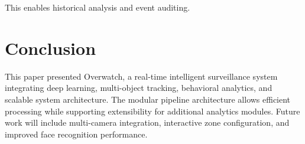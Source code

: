 \documentclass[conference]{IEEEtran}
\begin{document}
This enables historical analysis and event auditing.

\section{Conclusion}

This paper presented Overwatch, a real-time intelligent surveillance system integrating deep learning, multi-object tracking, behavioral analytics, and scalable system architecture. The modular pipeline architecture allows efficient processing while supporting extensibility for additional analytics modules. Future work will include multi-camera integration, interactive zone configuration, and improved face recognition performance.




\end{document}
